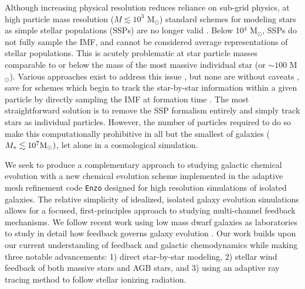\documentclass[twocolumn]{aastex61}
\begin{document}
Although increasing physical resolution reduces 
reliance on sub-grid physics, at high particle mass resolution ($M \lesssim 10^3$ M$_{\odot}$) standard schemes for modeling stars as simple stellar populations (SSPs) are no longer valid \citep[as studied in detail in ][]{Revaz2016}. Below 10$^4$ M$_{\odot}$, SSPs do not fully sample the IMF, and cannot be considered average representations of stellar populations. This is acutely problematic at star particle masses comparable to or below the mass of the most massive individual star (or $\sim 100$ M$_{\odot}$). Various approaches exist to address this issue \citep[e.g.][]{Kobayashi2000,WeidnerKroupa2004,Pflamm-AltenburgKroupa2006,RevazJablonka2012,Kroupa2013,Rosdahl2015,Su2017b}, but none are without caveats \citep{Revaz2016}, save for schemes which begin to track the star-by-star information within a given particle by directly sampling the IMF at formation time \citep[e.g.][]{Hu2017}. 
   The most straightforward
solution is to remove the SSP formalism entirely and simply track stars as individual particles. However, the number of particles required to do so make this computationally prohibitive in all but the smallest of galaxies ($M_{*} \lesssim 10^{7} {\rm M_{\odot}})$, let alone in a cosmological simulation.

We seek to produce a complementary approach to studying galactic chemical evolution with a new chemical evolution scheme implemented in the adaptive mesh refinement code \texttt{Enzo} designed for high resolution simulations of isolated galaxies. The relative simplicity of idealized, isolated galaxy evolution simulations allows for a focused, first-principles approach to studying multi-channel feedback mechanisms. We follow recent work using low mass dwarf galaxies as laboratories to study in detail how feedback governs galaxy evolution \citep{Forbes2016,Hu2016,Hu2017}.
Our work builds upon our current understanding of feedback and galactic chemodynamics while making three notable advancements: 1) direct star-by-star modeling, 2) stellar wind feedback of both massive stars and AGB stars, and 3) using an adaptive ray tracing method to follow stellar ionizing radiation. 
\end{document}
